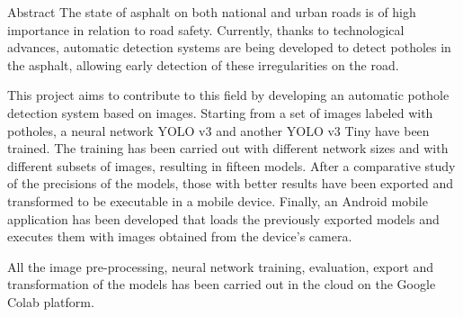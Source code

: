 \begin{poliabstract}{Abstract}
\noindent
The state of asphalt on both national and urban roads is of high importance in relation to road safety. Currently, thanks to technological advances, automatic detection systems are being developed to detect potholes in the asphalt, allowing early detection of these irregularities on the road.

\doublespacing\singlespacing
\noindent
This project aims to contribute to this field by developing an automatic pothole detection system based on images. Starting from a set of images labeled with potholes, a neural network YOLO v3 and another YOLO v3 Tiny have been trained. The training has been carried out with different network sizes and with different subsets of images, resulting in fifteen models. After a comparative study of the precisions of the models, those with better results have been exported and transformed to be executable in a mobile device. Finally, an Android mobile application has been developed that loads the previously exported models and executes them with images obtained from the device's camera.

\doublespacing\singlespacing
\noindent
All the image pre-processing, neural network training, evaluation, export and transformation of the models has been carried out in the cloud on the Google Colab platform.
\end{poliabstract}